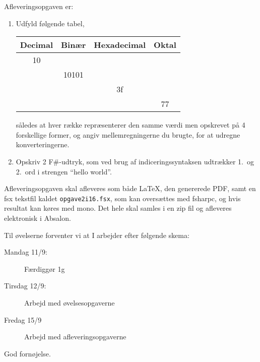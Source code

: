 \documentclass[a4paper,12pt]{article}
\begin{document}
Afleveringsopgaven er:
\begin{enumerate}[label=2i.\arabic*,start=0]
\item Udfyld følgende tabel,
  \begin{center}
    \begin{tabular}{|c|c|c|c|}
      \hline
      Decimal & Binær & Hexadecimal & Oktal\\
      \hline
              10 &  &  & \\
      \hline
              & 10101 &  & \\
      \hline
               &  & 3f  & \\
      \hline
              &  &  & 77 \\
      \hline
    \end{tabular}
  \end{center}
således at hver række repræsenterer den samme værdi men opskrevet på 4 forskellige former, og angiv mellemregningerne du brugte, for at udregne konverteringerne.
\item Opskriv 2 F\#-udtryk, som ved brug af indiceringssyntaksen udtrækker 1.\ og 2.\ ord i strengen ``hello world''.
\end{enumerate}
Afleveringsopgaven skal afleveres som både LaTeX, den genererede PDF,
samt en fsx tekstfil kaldet \verb|opgave2i16.fsx|, som kan oversættes med fsharpc, og hvis resultat kan køres med mono. Det hele skal samles i en zip fil og afleveres elektronisk i Absalon.

Til øvelserne forventer vi at I arbejder efter følgende skema:
\begin{description}
\item[Mandag 11/9:] Færdiggør 1g
\item[Tirsdag 12/9:] Arbejd med øvelsesopgaverne
\item[Fredag 15/9]  Arbejd med afleveringsopgaverne
\end{description}


\flushright God fornøjelse.
\end{document}
